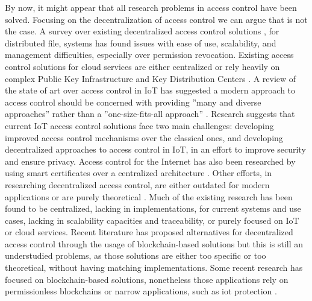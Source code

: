 By now, it might appear that all research problems in access control have been solved. Focusing on the decentralization of access control we can argue that is not the case. A survey over existing decentralized access control solutions \cite{miltchev_decentralized_2008}, for distributed file, systems has found issues with ease of use, scalability, and management difficulties, especially over permission revocation. Existing access control solutions for cloud services are either centralized \cite{calero_toward_2010, ruj_dacc:_2011, yu_achieving_2010} or rely heavily on complex Public Key Infrastructure and Key Distribution Centers \cite{ruj_privacy_2012, ruj_decentralized_2014,bauer_distributed_2005}. A review of the state of art over access control in IoT \cite{ouaddah_access_2017} has suggested a modern approach to access control should be concerned with providing ”many and diverse approaches” \cite[242]{ouaddah_access_2017} rather than a ”one-size-fits-all approach” \cite[242]{ouaddah_access_2017}. Research \cite{ouaddah_access_2017} suggests that current IoT access control solutions face two main challenges: developing improved access control mechanisms over the classical ones, and developing decentralized approaches to access control in IoT, in an effort to improve security and ensure privacy. Access control for the Internet has also been researched by using smart certificates over a centralized architecture \cite{park_smart_1999}. Other efforts, in researching decentralized access control, are either outdated for modern applications \cite{satyanarayanan_integrating_1989, karger_non-discretionary_1977} or are purely theoretical \cite{thomas_towards_1993}. Much of the existing research has been found to be centralized, lacking in implementations, for current systems and use cases, lacking in scalability capacities and traceability, or purely focused on IoT or cloud services. Recent literature has proposed alternatives for decentralized access control through the usage of blockchain-based solutions but this is still an understudied problems, as those solutions are either too specific or too theoretical, without having matching implementations. Some recent research has focused on blockchain-based solutions, nonetheless those applications rely on permissionless blockchains \cite{maesa_blockchain_2017} or narrow applications, such as \gls{iot} protection \cite{ouaddah_fairaccess:_2017}.

